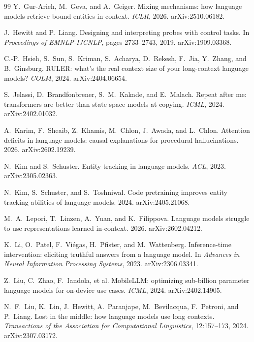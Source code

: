 \documentclass{article}
\begin{document}
\begin{thebibliography}{99}
Y.~Gur-Arieh, M.~Geva, and A.~Geiger. Mixing mechanisms: how language models retrieve bound
entities in-context. \emph{ICLR}, 2026. arXiv:2510.06182.

J.~Hewitt and P.~Liang. Designing and interpreting probes with control tasks. In \emph{Proceedings
of EMNLP-IJCNLP}, pages 2733--2743, 2019. arXiv:1909.03368.

C.-P.~Hsieh, S.~Sun, S.~Kriman, S.~Acharya, D.~Rekesh, F.~Jia, Y.~Zhang, and B.~Ginsburg.
RULER: what's the real context size of your long-context language models? \emph{COLM}, 2024.
arXiv:2404.06654.

S.~Jelassi, D.~Brandfonbrener, S.~M.~Kakade, and E.~Malach. Repeat after me: transformers are
better than state space models at copying. \emph{ICML}, 2024. arXiv:2402.01032.

A.~Karim, F.~Sheaib, Z.~Khamis, M.~Chlon, J.~Awada, and L.~Chlon. Attention deficits in language
models: causal explanations for procedural hallucinations. 2026. arXiv:2602.19239.

N.~Kim and S.~Schuster. Entity tracking in language models. \emph{ACL}, 2023. arXiv:2305.02363.

N.~Kim, S.~Schuster, and S.~Toshniwal. Code pretraining improves entity tracking abilities of
language models. 2024. arXiv:2405.21068.

M.~A.~Lepori, T.~Linzen, A.~Yuan, and K.~Filippova. Language models struggle to use representations
learned in-context. 2026. arXiv:2602.04212.

K.~Li, O.~Patel, F.~Vi\'egas, H.~Pfister, and M.~Wattenberg. Inference-time intervention: eliciting
truthful answers from a language model. In \emph{Advances in Neural Information Processing Systems},
2023. arXiv:2306.03341.

Z.~Liu, C.~Zhao, F.~Iandola, et al. MobileLLM: optimizing sub-billion parameter language models
for on-device use cases. \emph{ICML}, 2024. arXiv:2402.14905.

N.~F.~Liu, K.~Lin, J.~Hewitt, A.~Paranjape, M.~Bevilacqua, F.~Petroni, and P.~Liang.
Lost in the middle: how language models use long contexts.
\emph{Transactions of the Association for Computational Linguistics}, 12:157--173, 2024.
arXiv:2307.03172.


\end{thebibliography}
\end{document}
